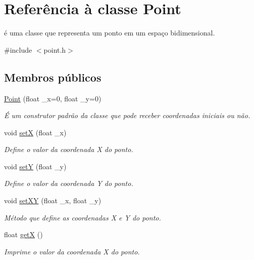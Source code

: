 \hypertarget{class_point}{}\section{Referência à classe Point}
\label{class_point}


é uma classe que representa um ponto em um espaço bidimensional.  




{\ttfamily \#include $<$point.\+h$>$}

\subsection*{Membros públicos}
\begin{DoxyCompactItemize}
\item 
\mbox{\hyperlink{class_point_a06c32166c2ad9eac25799ef189b49683}{Point}} (float \+\_\+x=0, float \+\_\+y=0)
\begin{DoxyCompactList}\small\item\em É um construtor padrão da classe que pode receber coordenadas iniciais ou não. \end{DoxyCompactList}\item 
void \mbox{\hyperlink{class_point_a428a1676e2fdec6753c42011a1d59d18}{setX}} (float \+\_\+x)
\begin{DoxyCompactList}\small\item\em Define o valor da coordenada X do ponto. \end{DoxyCompactList}\item 
void \mbox{\hyperlink{class_point_a9868c4601b0ea0c2d0de20fe41ee0e49}{setY}} (float \+\_\+y)
\begin{DoxyCompactList}\small\item\em Define o valor da coordenada Y do ponto. \end{DoxyCompactList}\item 
void \mbox{\hyperlink{class_point_ab5385c6d9bfa841e641e4709fc9f14cc}{set\+XY}} (float \+\_\+x, float \+\_\+y)
\begin{DoxyCompactList}\small\item\em Método que define as coordenadas X e Y do ponto. \end{DoxyCompactList}\item 
float \mbox{\hyperlink{class_point_acc27466778cc87a662bba40268c4c0c8}{getX}} ()
\begin{DoxyCompactList}\small\item\em Imprime o valor da coordenada X do ponto. \end{DoxyCompactList}\item 

\end{DoxyCompactItemize}
